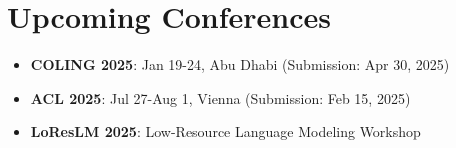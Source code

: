\documentclass[12pt,a4paper]{article}
\begin{document}
\section*{Upcoming Conferences}
\begin{itemize}
    \item \textbf{COLING 2025}: Jan 19-24, Abu Dhabi (Submission: Apr 30, 2025) \cite{coling2025}
    \item \textbf{ACL 2025}: Jul 27-Aug 1, Vienna (Submission: Feb 15, 2025) \cite{acl2025}
    \item \textbf{LoResLM 2025}: Low-Resource Language Modeling Workshop \cite{loreslm2025}
\end{itemize}



\end{document}
